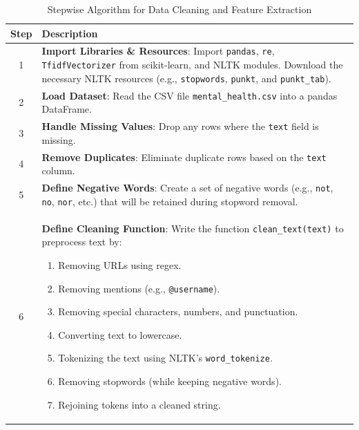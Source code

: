 \begin{table}[H]
    \caption*{Stepwise Algorithm for Data Cleaning and Feature Extraction}
    \label{tab:algorithm}
    \centering
    \begin{tabularx}{\textwidth}{|c|X|}
    \hline
    \textbf{Step} & \textbf{Description} \\
    \hline
    1 & \textbf{Import Libraries \& Resources}: Import \texttt{pandas}, \texttt{re}, \texttt{TfidfVectorizer} from scikit-learn, and NLTK modules. Download the necessary NLTK resources (e.g., \texttt{stopwords}, \texttt{punkt}, and \texttt{punkt\_tab}). \\
    \hline
    2 & \textbf{Load Dataset}: Read the CSV file \texttt{mental\_health.csv} into a pandas DataFrame. \\
    \hline
    3 & \textbf{Handle Missing Values}: Drop any rows where the \texttt{text} field is missing. \\
    \hline
    4 & \textbf{Remove Duplicates}: Eliminate duplicate rows based on the \texttt{text} column. \\
    \hline
    5 & \textbf{Define Negative Words}: Create a set of negative words (e.g., \texttt{not}, \texttt{no}, \texttt{nor}, etc.) that will be retained during stopword removal. \\
    \hline
    6 & \textbf{Define Cleaning Function}: Write the function \texttt{clean\_text(text)} to preprocess text by:
        
      \begin{enumerate}[label=(\alph*), itemsep=0pt, topsep=0pt, partopsep=0pt, parsep=0pt]
        \item Removing URLs using regex.
        \item Removing mentions (e.g., \texttt{@username}).
        \item Removing special characters, numbers, and punctuation.
        \item Converting text to lowercase.
        \item Tokenizing the text using NLTK's \texttt{word\_tokenize}.
        \item Removing stopwords (while keeping negative words).
        \item Rejoining tokens into a cleaned string.
      \end{enumerate} \\
    \hline
\end{tabularx}
\end{table}

